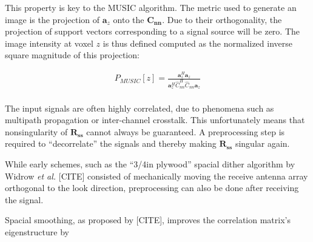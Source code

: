 This property is key to the MUSIC algorithm.
The metric used to generate an image is the projection of $\mathbf a_z$ onto the $\mathbf{C_{nn}}$.
Due to their orthogonality, the projection of support vectors corresponding to a signal source will be zero.
The image intensity at voxel $z$ is thus defined computed as the normalized inverse square magnitude of this projection:

\begin{align}
    P_{MUSIC}[z] = \frac{\mathbf{a}_z^H \mathbf{a}_z}{\mathbf{a}_z^H\hat C_{nn}^H\hat C_{nn}\mathbf{a}_z}
\end{align} \\

The input signals are often highly correlated, due to phenomena such as multipath propagation or inter-channel crosstalk.
This unfortunately means that nonsingularity of $\mathbf{R_{ss}}$ cannot always be guaranteed.
A preprocessing step is required to ``decorrelate'' the signals and thereby making $\mathbf{R_{ss}}$ singular again.

While early schemes, such as the ``3/4in plywood'' spacial dither algorithm by Widrow \textit{et al.} [CITE]
consisted of mechanically moving the receive antenna array orthogonal to the look direction,
preprocessing can also be done after receiving the signal.

Spacial smoothing, as proposed by [CITE], improves the correlation matrix's eigenstructure by
